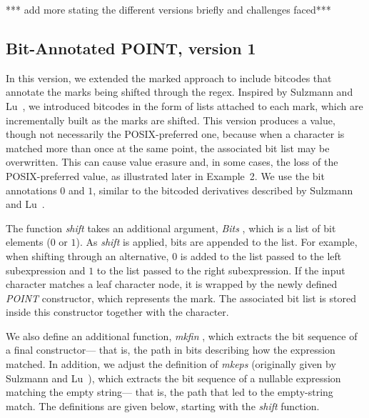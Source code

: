 \documentclass[12pt]{article}
\newcommand{\shift}{\textit{shift }}
\newcommand{\mkeps}{\textit{mkeps }}
\newcommand{\Bits}{\textit{Bits }}
\newcommand{\POINT}{\textit{POINT }}
\newcommand{\mkfin}{\textit{mkfin }}
\begin{document}
*** add more stating the different versions briefly and challenges faced***

\subsection{Bit-Annotated POINT, version 1}

In this version, we extended the marked approach to include bitcodes that annotate the marks being 
shifted through the regex. Inspired by Sulzmann and Lu~\cite{Sulzmann2014}, we introduced bitcodes in the form 
of lists attached to each mark, which are incrementally built as the marks are shifted.  
This version produces a value, though not necessarily the POSIX-preferred one, because when a character is matched 
more than once at the same point, the associated bit list may be overwritten.  
This can cause value erasure and, in some cases, the loss of the POSIX-preferred value, as illustrated later in Example~2.  
We use the bit annotations $0$ and $1$, similar to the bitcoded derivatives described by Sulzmann and Lu~\cite{Sulzmann2014}.  

The function \shift takes an additional argument, \Bits, which is a list of bit elements ($0$ or $1$).  
As \shift is applied, bits are appended to the list.  
For example, when shifting through an alternative, $0$ is added to the list passed to the left subexpression 
and $1$ to the list passed to the right subexpression.  
If the input character matches a leaf character node, it is wrapped by the newly defined \POINT constructor, 
which represents the mark.  
The associated bit list is stored inside this constructor together with the character.  

We also define an additional function, \mkfin, which extracts the bit sequence of a final constructor--- 
that is, the path in bits describing how the expression matched.  
In addition, we adjust the definition of \mkeps (originally given by Sulzmann and Lu~\cite{Sulzmann2014}),  
which extracts the bit sequence of a nullable expression matching the empty string--- 
that is, the path that led to the empty-string match.  
The definitions are given below, starting with the \shift function.  
\end{document}
